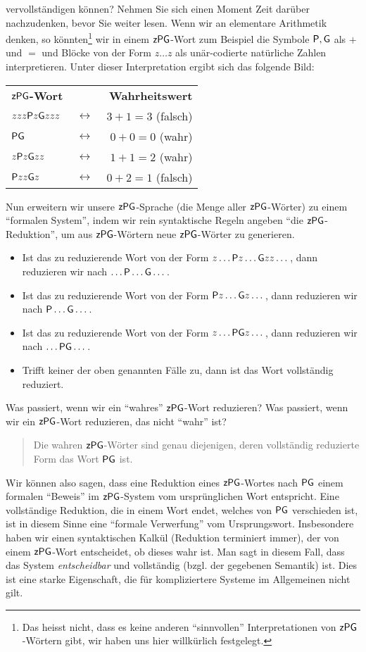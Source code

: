 vervollständigen können? Nehmen Sie sich einen Moment Zeit darüber nachzudenken, bevor Sie
weiter lesen. Wenn wir an elementare Arithmetik denken, so könnten\footnote{Das heisst nicht,
dass es keine anderen ``sinnvollen'' Interpretationen von $\mathsf{z}\mathsf{P}\mathsf{G}$-Wörtern gibt, wir haben uns hier
willkürlich festgelegt.} wir in einem $\mathsf{z}\mathsf{P}\mathsf{G}$-Wort zum Beispiel die Symbole $\mathsf{P},\mathsf{G}$ als  $+$ und
$=$
und Blöcke von der Form $z\dots z$ als unär-codierte natürliche Zahlen interpretieren. Unter dieser
Interpretation ergibt sich das folgende Bild:
\begin{center}
\begin{tabular}{ l c r }
\textbf{$\mathsf{z}\mathsf{P}\mathsf{G}$-Wort}& &\textbf{Wahrheitswert}\\
  $zzz\mathsf{P} z \mathsf{G} zzz$ & $\,\longleftrightarrow\,$ &$3+1=3$ (falsch) \\
  $\mathsf{P}\mathsf{G}$ &  $\,\longleftrightarrow\,$ &$0+0=0$ (wahr)\\
  $z\mathsf{P} z\mathsf{G} zz$ &  $\,\longleftrightarrow\,$ & $1+1=2$ (wahr)\\
  $\mathsf{P} zz\mathsf{G} z$ & $\,\longleftrightarrow\,$ & $0+2=1$ (falsch)
\end{tabular}
\end{center}
Nun erweitern wir unsere $\mathsf{z}\mathsf{P}\mathsf{G}$-Sprache (die Menge aller $\mathsf{z}\mathsf{P}\mathsf{G}$-Wörter) zu einem
``formalen System'', indem wir rein syntaktische Regeln angeben ``die $\mathsf{z}\mathsf{P}\mathsf{G}$-Reduktion'', um
aus $\mathsf{z}\mathsf{P}\mathsf{G}$-Wörtern neue $\mathsf{z}\mathsf{P}\mathsf{G}$-Wörter zu generieren.
\begin{itemize}
\item Ist das zu reduzierende Wort von der Form $z\dots\mathsf{P} z\dots\mathsf{G} zz\dots$, dann reduzieren wir nach $\dots\mathsf{P}
\dots\mathsf{G} \dots$.
\item Ist das zu reduzierende Wort von der Form $\mathsf{P} z\dots\mathsf{G} z\dots$, dann reduzieren wir nach $\mathsf{P} \dots\mathsf{G}
\dots$.
\item Ist das zu reduzierende Wort von der Form $z\dots\mathsf{P}\mathsf{G} z\dots$, dann reduzieren wir nach $\dots\mathsf{P}\mathsf{G} \dots$.
\item Trifft keiner der oben genannten Fälle zu, dann ist das Wort vollständig reduziert.
\end{itemize}
Was passiert, wenn wir ein ``wahres'' $\mathsf{z}\mathsf{P}\mathsf{G}$-Wort reduzieren? Was passiert, wenn wir ein
$\mathsf{z}\mathsf{P}\mathsf{G}$-Wort reduzieren, das nicht ``wahr'' ist?
\begin{quote}
Die wahren $\mathsf{z}\mathsf{P}\mathsf{G}$-Wörter sind genau diejenigen,
deren vollständig reduzierte Form das Wort $\mathsf{P}\mathsf{G}$ ist.
\end{quote}
Wir können also sagen, dass eine Reduktion
eines $\mathsf{z}\mathsf{P}\mathsf{G}$-Wortes nach $\mathsf{P}\mathsf{G}$ einem formalen ``Beweis'' im $\mathsf{z}\mathsf{P}\mathsf{G}$-System vom
ursprünglichen Wort entspricht. Eine vollständige Reduktion, die in einem Wort endet, welches von
$\mathsf{P}\mathsf{G}$ verschieden ist, ist in diesem Sinne eine ``formale Verwerfung'' vom Ursprungswort. Insbesondere haben wir einen
syntaktischen Kalkül (Reduktion terminiert immer), der von einem $\mathsf{z}\mathsf{P}\mathsf{G}$-Wort entscheidet, ob dieses wahr ist. Man sagt in
diesem Fall, dass das System \textit{entscheidbar} und vollständig (bzgl. der gegebenen Semantik) ist. Dies ist eine starke
Eigenschaft, die für kompliziertere Systeme im Allgemeinen nicht gilt.

